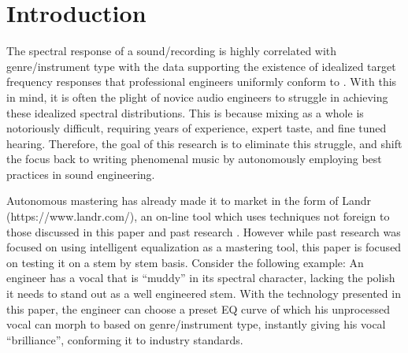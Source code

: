 \documentclass{article}
\title{\papertitle}
\begin{document}
\capstartfalse
\maketitle
\capstarttrue

\begin{abstract}
In this paper, intelligent equalization is implemented using a dynamic IIR filter where the coefficients are generated via the Yule-Walker method.  While in previous research this technique was shown to be an effective form of intelligent mastering, the goal of this paper is to test these methods in a multi-track setting for future implementation in autonomous mixing systems.  In this off-line MATLAB implementation, audio examples are provided to show the result of filtering, and the spectras are compared to objectivley observe the results.  To look at the code used to run this experiment, visit https://github.com/bombsandbottles/Intelligent-Equalization.
\end{abstract}


\section{Introduction}
\label{sec:Introduction}

The spectral response of a sound/recording is highly correlated with genre/instrument type with the data supporting the existence of idealized target frequency responses that professional engineers uniformly conform to \cite{pestana2013spectral}.  With this in mind, it is often the plight of novice audio engineers to struggle in achieving these idealized spectral distributions.  This is because mixing as a whole is notoriously difficult, requiring years of experience, expert taste, and fine tuned hearing.  Therefore, the goal of this research is to eliminate this struggle, and shift the focus back to writing phenomenal music by autonomously employing best practices in sound engineering.

Autonomous mastering has already made it to market in the form of Landr (https://www.landr.com/), an on-line tool which uses techniques not foreign to those discussed in this paper and past research \cite{ma2013implementation}.  However while past research was focused on using intelligent equalization as a mastering tool, this paper is focused on testing it on a stem by stem basis.  Consider the following example:  An engineer has a vocal that is ``muddy'' in its spectral character, lacking the polish it needs to stand out as a well engineered stem.  With the technology presented in this paper, the engineer can choose a preset EQ curve of which his unprocessed vocal can morph to based on genre/instrument type, instantly giving his vocal ``brilliance'', conforming it to industry standards.
\end{document}
